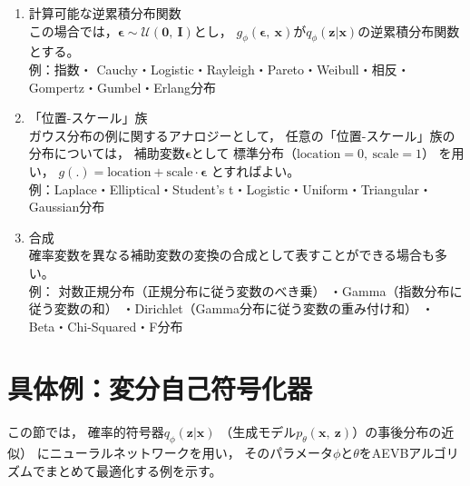 \documentclass[dvipdfmx, fleqn, draft]{jsarticle}
\begin{document}
\begin{enumerate}
    \item 計算可能な逆累積分布関数 \\
        この場合では，\(\bm{\epsilon} \sim \mathcal{U}(\bm{0},\ \bm{I})\)とし，
        \(g_{\phi} (\bm{\epsilon},\ \bm{x})\)が\(q_{\phi} (\bm{z} | \bm{x})\)の逆累積分布関数とする。\\
        例：指数・ Cauchy・Logistic・Rayleigh・Pareto・Weibull・相反・Gompertz・Gumbel・Erlang分布
    \item 「位置-スケール」族 \\
        ガウス分布の例に関するアナロジーとして，
        任意の「位置-スケール」族の分布については，
        補助変数\(\bm{\epsilon}\)として
        標準分布（\(\mathrm{location} = 0,\ \mathrm{scale} = 1\)）
        を用い，
        \(g(.) = \mathrm{location} + \mathrm{scale} \cdot \bm{\epsilon}\)
        とすればよい。 \\
        例：Laplace・Elliptical・Student’s t・Logistic・Uniform・Triangular・Gaussian分布
    \item 合成 \\
        確率変数を異なる補助変数の変換の合成として表すことができる場合も多い。 \\
        例：
            対数正規分布（正規分布に従う変数のべき乗）
            ・Gamma（指数分布に従う変数の和）
            ・Dirichlet（Gamma分布に従う変数の重み付け和）
            ・ Beta・Chi-Squared・F分布
\end{enumerate}



\section{具体例：変分自己符号化器}

この節では，
確率的符号器\(q_{\phi} (\bm{z} | \bm{x})\)
（生成モデル\(p_{\theta} (\bm{x},\ \bm{z})\)）の事後分布の近似）
にニューラルネットワークを用い，
そのパラメータ\(\phi\)と\(\theta\)をAEVBアルゴリズムでまとめて最適化する例を示す。
\end{document}
